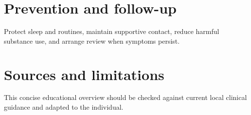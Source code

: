 \section*{Prevention and follow-up}
Protect sleep and routines, maintain supportive contact, reduce harmful substance use, and arrange review when symptoms persist.

\section*{Sources and limitations}
This concise educational overview should be checked against current local clinical guidance and adapted to the individual.
